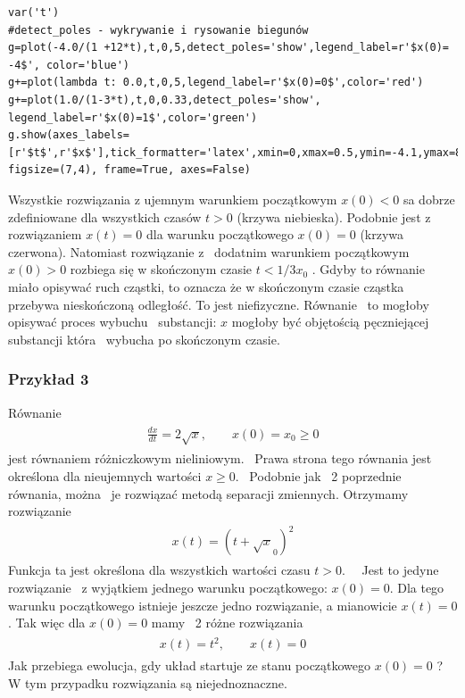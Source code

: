 \documentclass[a4paper,12pt,polish]{sphinxmanual}
\begin{document}
\begin{verbatim}
var('t')
#detect_poles - wykrywanie i rysowanie biegunów
g=plot(-4.0/(1 +12*t),t,0,5,detect_poles='show',legend_label=r'$x(0)= -4$', color='blue')
g+=plot(lambda t: 0.0,t,0,5,legend_label=r'$x(0)=0$',color='red')
g+=plot(1.0/(1-3*t),t,0,0.33,detect_poles='show', legend_label=r'$x(0)=1$',color='green')
g.show(axes_labels=[r'$t$',r'$x$'],tick_formatter='latex',xmin=0,xmax=0.5,ymin=-4.1,ymax=8, figsize=(7,4), frame=True, axes=False)
\end{verbatim}


Wszystkie rozwiązania z ujemnym warunkiem początkowym $x(0) < 0$ sa dobrze zdefiniowane dla wszystkich czasów $t>0$ (krzywa niebieska). Podobnie jest z rozwiązaniem $x(t) = 0$ dla warunku początkowego $x(0)=0$ (krzywa czerwona). Natomiast rozwiązanie z  dodatnim warunkiem początkowym $x(0) > 0$ rozbiega się w skończonym czasie $t< 1/3x_0$ . Gdyby to równanie miało opisywać ruch cząstki, to oznacza że w skończonym czasie cząstka przebywa nieskończoną odległość. To jest niefizyczne. Równanie  to mogłoby   opisywać proces wybuchu  substancji: $x$ mogłoby być objętością pęczniejącej substancji która  wybucha po skończonym czasie.


\subsubsection{Przykład 3}
\label{ch1/chI021:przyklad-3}
Równanie
\label{ch1/chI021:equation-eqn12}\begin{gather}
\begin{split}\frac{dx}{dt}=  2 \sqrt x, \qquad x(0) = x_0 \ge 0\end{split}\label{ch1/chI021-eqn12}
\end{gather}
jest równaniem różniczkowym nieliniowym.  Prawa strona tego równania jest określona dla nieujemnych wartości $x \ge 0$.  Podobnie jak  2 poprzednie równania, można  je rozwiązać metodą separacji zmiennych. Otrzymamy rozwiązanie
\label{ch1/chI021:equation-eqn13}\begin{gather}
\begin{split}x(t) = (t +  \sqrt x_0)^2\end{split}\label{ch1/chI021-eqn13}
\end{gather}
Funkcja ta jest określona dla wszystkich wartości czasu $t >0$.   Jest to jedyne  rozwiązanie  z wyjątkiem jednego warunku początkowego: $x(0) = 0$. Dla tego warunku początkowego istnieje jeszcze jedno rozwiązanie, a mianowicie $x(t) = 0$. Tak więc dla $x(0) = 0$ mamy  2 różne rozwiązania
\label{ch1/chI021:equation-eqn14}\begin{gather}
\begin{split}x(t) = t^2, \qquad x(t) = 0\end{split}\label{ch1/chI021-eqn14}
\end{gather}
Jak przebiega ewolucja, gdy układ startuje ze stanu początkowego $x(0) = 0$ ? W tym przypadku rozwiązania są niejednoznaczne.
\end{document}
